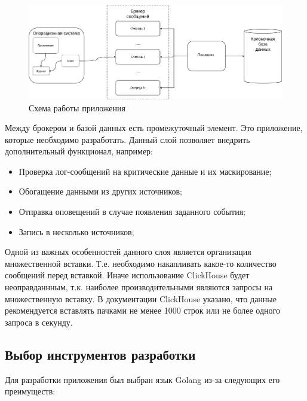 \documentclass[14pt, russian]{scrartcl}
\begin{document}
\begin{figure}[H]
	\centering
	\begin{minipage}[t]{.9\textwidth}
		\centering
		\includegraphics[width=.7\textwidth]{./imgs/appscheme.png}
	\end{minipage}
	\caption{Схема работы приложения}
	\label{fig:appscheme}
\end{figure}


Между брокером и базой данных есть промежуточный элемент. Это приложение,
которые необходимо разработать. Данный слой позволяет
внедрить дополнительный функционал, например:

\begin{itemize}
	\item Проверка лог-сообщений на критические данные и их маскирование;
	\item Обогащение данными из других источников;
	\item Отправка оповещений в случае появления заданного события;
	\item Запись в несколько источников;
\end{itemize}

Одной из важных особенностей данного слоя является организация
множественной вставки. Т.е. необходимо накапливать
какое-то количество сообщений перед вставкой.
Иначе использование ClickHouse будет неоправданнным, т.к.
наиболее производительными являются запросы на множественную
вставку. В документации ClickHouse \cite{ClickDocs} указано, что данные
рекомендуется вставлять пачками не менее 1000 строк
или не более одного запроса в секунду.

\subsection{Выбор инструментов разработки}

Для разработки приложения был выбран язык Golang \cite{Golang} из-за следующих его преимуществ:
\end{document}
